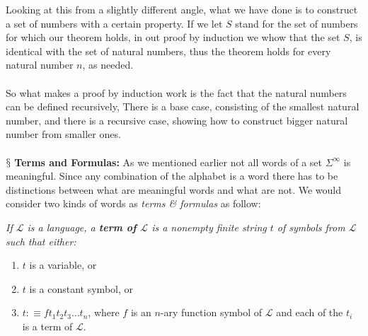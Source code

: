 \documentclass[10pt,a4paper]{article}
\newcounter{theo}
\newcommand{\newpoint}[1]{\indent$\mathsection$ \textbf{#1}}
\newcommand{\curveL}{\mathcal{L}}
\begin{document}
                    Looking at this from a slightly different angle, what we have done is to construct a set of numbers with a certain property. If we let $S$ stand for the set of numbers for which our theorem holds, in out proof by induction we whow that the set $S$, is identical with the set of natural numbers, thus the theorem holds for every natural number $n$, as needed.
                    \\
                    \\
                    So what makes a proof by induction work is the fact that the natural numbers can be defined recursively, There is a base case, consisting of the smallest natural number, and there is a recursive case, showing how to construct bigger natural number from smaller ones.
                    \\
                    \\
                    \newpoint{Terms and Formulas:} As we mentioned earlier not all words of a set $\Sigma^\infty$ is meaningful. Since any combination of the alphabet is a word there has to be distinctions between what are meaningful words and what are not. We would consider two kinds of words as \textit{terms \& formulas} as follow:
                    \begin{define}
                        \textit{If $\curveL$ is a language, a \textbf{term of $\curveL$} is a nonempty finite string $t$ of symbols from $\curveL$ such that either:}
                        \begin{enumerate}
                            \item $t$ is a variable, or
                            \item $t$ is a constant symbol, or 
                            \item $t:\equiv ft_1t_2t_3\dots t_n$, where $f$ is an $n$-ary function symbol of $\curveL$ and each of the $t_i$ is a term of $\curveL$.
                        \end{enumerate}
                    \end{define}
\end{document}
